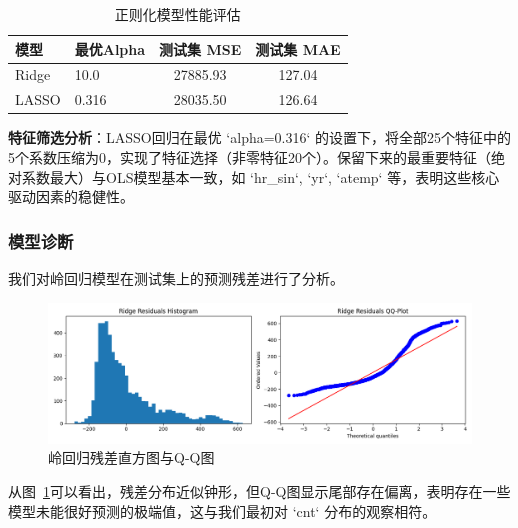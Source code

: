 \documentclass[UTF8,a4paper,10pt]{ctexart}
\begin{document}
\begin{table}[H]
    \centering
    \caption{正则化模型性能评估}
    \begin{tabular}{llcc}
        \toprule
        \textbf{模型} & \textbf{最优Alpha} & \textbf{测试集 MSE} & \textbf{测试集 MAE} \\
        \midrule
        Ridge & 10.0 & 27885.93 & 127.04 \\
        LASSO & 0.316 & 28035.50 & 126.64 \\
        \bottomrule
    \end{tabular}
\end{table}

\textbf{特征筛选分析}：LASSO回归在最优 `alpha=0.316` 的设置下，将全部25个特征中的5个系数压缩为0，实现了特征选择（非零特征20个）。保留下来的最重要特征（绝对系数最大）与OLS模型基本一致，如 `hr\_sin`, `yr`, `atemp` 等，表明这些核心驱动因素的稳健性。

\subsubsection{模型诊断}
我们对岭回归模型在测试集上的预测残差进行了分析。
\begin{figure}[H]
    \centering
    \includegraphics[width=\linewidth]{pic/Ridge.png}
    \caption{岭回归残差直方图与Q-Q图}
    \label{fig:residuals}
\end{figure}
从图~\ref{fig:residuals}可以看出，残差分布近似钟形，但Q-Q图显示尾部存在偏离，表明存在一些模型未能很好预测的极端值，这与我们最初对 `cnt` 分布的观察相符。
\end{document}
